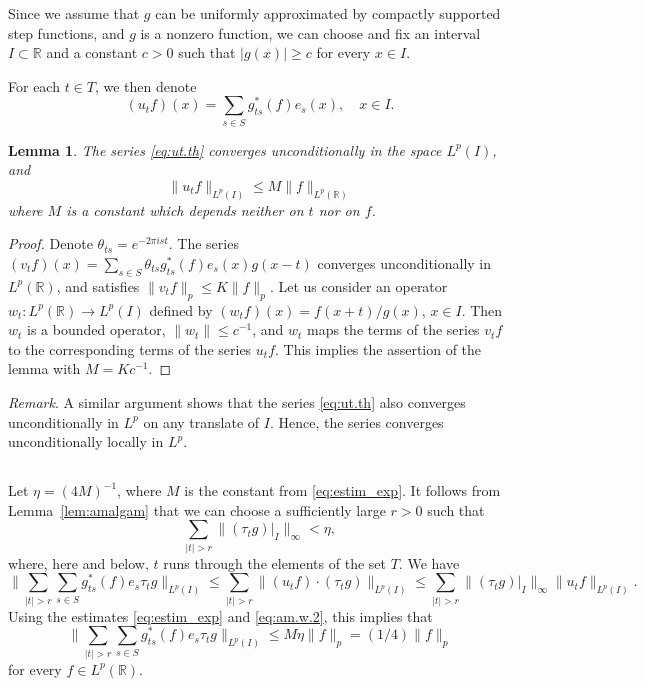 \documentclass[reqno,a4paper,12pt]{amsart}
\numberwithin{equation}{section}
\numberwithin{figure}{section}
\newcommand\R{\mathbb{R}}
\newcommand\1{\mathds{1}}
\newcommand{\TTT}{T}
\newcommand{\SSS}{S}
\newcommand{\ts}{\tau}
\renewcommand\le{\leqslant}
\renewcommand\ge{\geqslant}
\theoremstyle{plain}
\newtheorem{lem}[thm]{Lemma}
\newcommand{\lemref}[1]{Lemma~\ref{#1}}
\theoremstyle{definition}
\begin{document}
Since we assume that
$g$ can be uniformly approximated by compactly supported step functions,
and $g$ is a nonzero function, we can choose and fix 
an interval $I\subset\R$ and a constant $c > 0$ such that $|g(x)|\ge c$
for every  $x\in I$. 


For each $t \in T$, we then denote
\begin{equation}
\label{eq:ut.th}
(u_{t} f)(x) = \sum_{s\in \SSS} g_{ts}^*(f) e_s(x), \quad x \in I.
\end{equation}



\begin{lem}
\label{lem:estim_exp}
The series \eqref{eq:ut.th} converges unconditionally in the space $L^p(I)$, and
\begin{equation}
\label{eq:estim_exp}
\| u_t f\|_{L^p(I)}\le M \|f\|_{L^p(\R)}
\end{equation}
where $M$ is a constant which depends neither on $t$ nor on $f$.
\end{lem}

\begin{proof}
Denote $\theta_{ts} = e^{- 2 \pi i st}$. The series
$(v_t f)(x) = \sum_{s\in \SSS} \theta_{ts} g_{ts}^*(f) e_s (x) g(x-t)$
converges unconditionally in $L^p(\R)$, and satisfies
$\|v_t f\|_p \le K \|f\|_p$. Let us consider an operator
$w_t: L^p(\R) \to L^p(I)$ defined by
$(w_t f)(x) = f(x+t) / g(x)$, $x \in I$.
Then  $w_t$ is a bounded operator,
$\|w_t\| \le c^{-1}$, and $w_t$ maps the terms of the series
$v_t f$  to the corresponding terms of the series $u_t f$.
This implies the assertion of the lemma
with $M = K c^{-1}$.
\end{proof}

\emph{Remark}. A similar argument shows
that the series \eqref{eq:ut.th} also
converges unconditionally in $L^p$ on any translate
of  $I$. Hence, the series converges unconditionally locally in $L^p$.




\subsection{}
Let $\eta = (4M)^{-1}$, where $M$ is the constant from \eqref{eq:estim_exp}. 
It follows from \lemref{lem:amalgam} that  we can
choose a sufficiently large $r  >0$ such that
\begin{equation}
\label{eq:am.w.2}
\sum_{|t| > r} \| (\ts_tg)|_I \|_{\infty} < \eta,
\end{equation}
where, here and below, $t$ runs through the elements of the set $\TTT$.  We have
\begin{equation}
 \Big\|   \sum_{|t|>r}  \sum_{s\in \SSS}  
g_{ts}^*(f) e_s  \ts_t g \Big\|_{L^p(I)}
\le  \sum_{|t|>r} \|  (u_t f) \cdot (\ts_t g) \|_{L^p(I)} 
\le \sum_{|t| > r} \| (\ts_tg)|_I \|_{\infty}  \|u_t f \|_{L^p(I)}.
\end{equation}
Using the estimates \eqref{eq:estim_exp} and \eqref{eq:am.w.2},
this implies that
\begin{equation}
\label{eq:bl.est.1}
 \Big\|   \sum_{|t|>r}  \sum_{s\in \SSS}  g_{ts}^*(f) e_s  \ts_t g \Big\|_{L^p(I)}
\le M \eta \|f\|_p = (1/4) \|f\|_p
\end{equation}
for every $f \in L^p(\R)$.
\end{document}
